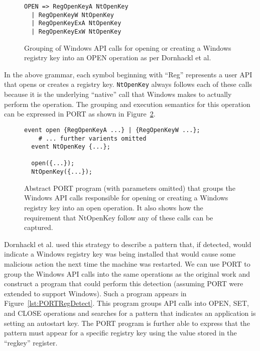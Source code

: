 \begin{figure}[H]
\begin{lstlisting}
OPEN => RegOpenKeyA NtOpenKey
  | RegOpenKeyW NtOpenKey
  | RegOpenKeyExA NtOpenKey
  | RegOpenKeyExW NtOpenKey
\end{lstlisting}
\caption{Grouping of Windows API calls for opening or creating a Windows
  registry key into an OPEN operation as per Dornhackl et al.}
\label{lst:DornhacklOpen}
\end{figure}


In the above grammar, each symbol beginning with ``Reg'' represents a user
API that opens or creates a registry key.  {\tt NtOpenKey} always follows
each of these calls because it is the underlying ``native'' call that
Windows makes to actually perform the operation.
The grouping and execution semantics for this operation can be expressed
in PORT as shown in Figure~\ref{lst:PORTOpenReg}.


\begin{figure}[H]
\begin{lstlisting}[gobble=2]
  event open {RegOpenKeyA ...} | {RegOpenKeyW ...};
    # ... further varients omitted
  event NtOpenKey {...};

  open({...});
  NtOpenKey({...});
\end{lstlisting}
  \caption{Abstract PORT program (with parameters
  omitted) that groups the Windows API calls responsible for opening or
  creating a Windows registry key into an open operation.  It also shows
  how the requirement that NtOpenKey follow any of these calls can be
  captured.}
\label{lst:PORTOpenReg}
\end{figure}

Dornhackl et al. used this strategy to describe a pattern that, if
detected, would indicate
a Windows registry key was being installed
that would cause some malicious action
the next time the machine was restarted.  We can use PORT to group the
Windows API calls into the same operations as the original work and
construct a program that could perform this detection (assuming PORT were
extended to support Windows).  Such a program appears in
Figure~\ref{lst:PORTRegDetect}.  This program groups API calls into OPEN,
SET, and CLOSE operations and searches for a pattern that
indicates
an application is
setting an autostart key.  The PORT program is further able to express
that the pattern must appear for a specific registry key using the value
stored in the ``regkey'' register.

